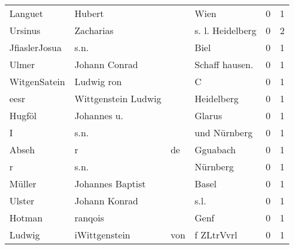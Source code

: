 \begin{tabular}{llllrr}
                  Languet &                             Hubert &             &                                        Wien &          0 &         1 \\
                  Ursinus &                          Zacharias &             &                            s. l. Heidelberg &          0 &         2 \\
            JfiaslerJosua &                               s.n. &             &                                        Biel &          0 &         1 \\
                    Ulmer &                      Johann Conrad &             &                             Schaff hausen.  &          0 &         1 \\
             WitgenSatein &                         Ludwig ron &             &                                           C &          0 &         1 \\
                     eesr &                Wittgenstein Ludwig &             &                                  Heidelberg &          0 &         1 \\
                   Hugföl &                        Johannes u. &             &                                      Glarus &          0 &         1 \\
                        I &                               s.n. &             &                                und Nürnberg &          0 &         1 \\
                    Abseh &                                  r &          de &                                    Gguabach &          0 &         1 \\
                        r &                               s.n. &             &                                    Nürnberg &          0 &         1 \\
                   Müller &                   Johannes Baptist &             &                                       Basel &          0 &         1 \\
                   Ulster &                      Johann Konrad &             &                                        s.l. &          0 &         1 \\
                   Hotman &                            ranqois &             &                                        Genf &          0 &         1 \\
                   Ludwig &                      iWittgenstein &         von &                                  f ZLtrVvrl &          0 &         1 \\

\end{tabular}
